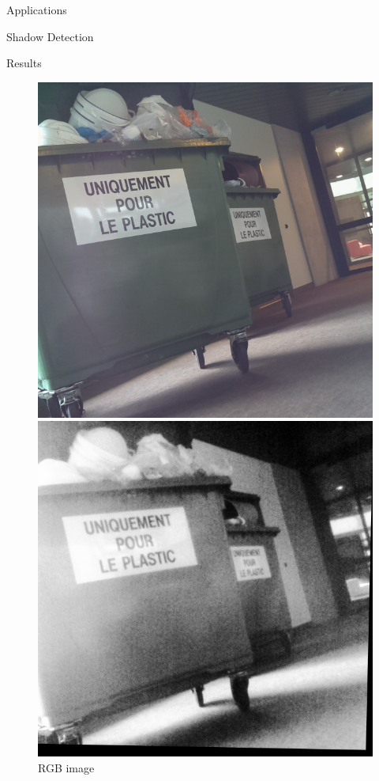 \documentclass[10pt]{article}
\begin{document}
\begin{section}{Applications}
\begin{subsection}{Shadow Detection}
\begin{subsubsection}{Results}
            \begin{figure}[!h]
                \centering
                \begin{minipage}[b]{0.32\textwidth}
                    \includegraphics[width=\textwidth]{fig/shadow_detection/rgb.jpg}
                    \caption{RGB image}
                \end{minipage} \hspace{0.1em} %
                \begin{minipage}[b]{0.32\textwidth}
                    \includegraphics[width=\textwidth]{fig/shadow_detection/nir_registered.jpg}

\end{minipage}
\end{figure}
\end{subsubsection}
\end{subsection}
\end{section}
\end{document}
